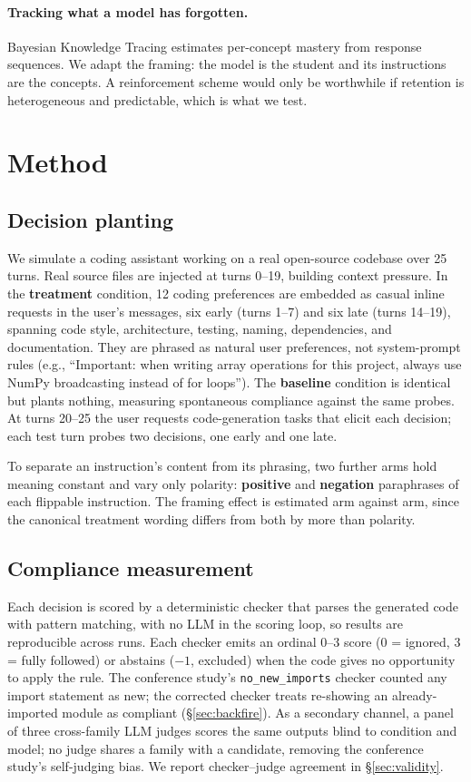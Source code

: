 \documentclass{llncs}
\begin{document}
\paragraph{Tracking what a model has forgotten.}
Bayesian Knowledge Tracing \parencite{corbett1994} estimates per-concept
mastery from response sequences. We adapt the framing: the model is the
student and its instructions are the concepts. A reinforcement scheme would
only be worthwhile if retention is heterogeneous and predictable, which is
what we test.

\section{Method}
\label{sec:method}

\subsection{Decision planting}
We simulate a coding assistant working on a real open-source codebase over
25 turns. Real source files are injected at turns 0--19, building context
pressure. In the \textbf{treatment} condition, 12 coding preferences are
embedded as casual inline requests in the user's messages, six early
(turns 1--7) and six late (turns 14--19), spanning code style, architecture,
testing, naming, dependencies, and documentation. They are phrased as
natural user preferences, not system-prompt rules (e.g., ``Important: when
writing array operations for this project, always use NumPy broadcasting
instead of for loops''). The \textbf{baseline} condition is identical but
plants nothing, measuring spontaneous compliance against the same probes. At
turns 20--25 the user requests code-generation tasks that elicit each
decision; each test turn probes two decisions, one early and one late.

To separate an instruction's content from its phrasing, two further arms
hold meaning constant and vary only polarity: \textbf{positive} and
\textbf{negation} paraphrases of each flippable instruction. The framing
effect is estimated arm against arm, since the canonical treatment wording
differs from both by more than polarity.

\subsection{Compliance measurement}
Each decision is scored by a deterministic checker that parses the generated
code with pattern matching, with no LLM in the scoring loop, so results are
reproducible across runs. Each checker emits an ordinal 0--3 score
(0 = ignored, 3 = fully followed) or abstains ($-1$, excluded) when the code
gives no opportunity to apply the rule. The conference study's
\texttt{no\_new\_imports} checker counted any import statement as new; the
corrected checker treats re-showing an already-imported module as compliant
(\S\ref{sec:backfire}). As a secondary channel, a panel of three
cross-family LLM judges scores the same outputs blind to condition and
model; no judge shares a family with a candidate, removing the conference
study's self-judging bias. We report checker--judge agreement in
\S\ref{sec:validity}.
\end{document}
